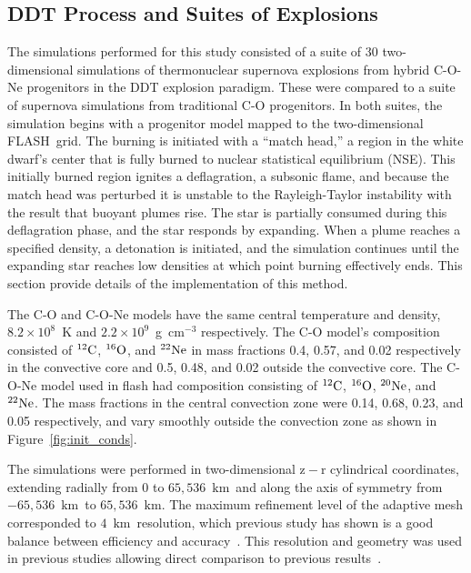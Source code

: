 \documentclass[iop,apj]{emulateapj}
\newcommand{\C}[1]{\ensuremath{{}^{#1}{\rm C}}}
\newcommand{\Ox}[1]{\ensuremath{{}^{#1}{\rm O}}}
\newcommand{\Ne}[1]{\ensuremath{{}^{#1}{\rm Ne}}}
\newcommand{\code}[1]{\textsc{#1}}
\newcommand{\FLASH}{\code{FLASH}}
\newcommand{\unitstyle}[1]{\ensuremath{\mathrm{#1}}}
\newcommand{\kilo}{\unitstyle{k}}
\newcommand{\meter}{\unitstyle{m}}
\newcommand{\km}{\kilo\meter}   %
\begin{document}
\subsection{DDT Process and Suites of Explosions}

The simulations performed for this study consisted of a suite of
30 two-dimensional simulations of
thermonuclear supernova
explosions from hybrid C-O-Ne progenitors in the DDT explosion paradigm. These
were compared to a suite of supernova simulations from traditional
C-O progenitors. In both suites, the simulation
begins with a progenitor model mapped to the two-dimensional
\FLASH\ grid. The burning is initiated with a ``match head,'' a region
in the white dwarf's center that is fully burned to nuclear statistical
equilibrium (NSE).
This initially burned region ignites a deflagration, a subsonic
flame, and because the match head was perturbed it is unstable to
the Rayleigh-Taylor instability with the result that buoyant plumes
rise. The star is partially consumed during this deflagration phase,
and the star responds by expanding.
When a plume reaches a specified density,
a detonation is initiated, and the simulation continues until
the expanding star reaches low densities at which point burning
effectively ends. This section provide details
of the implementation of this method.


The C-O and C-O-Ne models have the same central temperature
and density, $8.2\times 10^8$~K and $2.2\times 10^9$~g~cm$^{-3}$ respectively.
The C-O model's composition consisted of \C{12}, \Ox{16}, and \Ne{22} in mass fractions 0.4, 0.57, and 0.02 respectively in the convective core and 0.5, 0.48, and 0.02 outside the convective core.
The C-O-Ne model used in flash had composition consisting of \C{12}, \Ox{16}, \Ne{20}, and \Ne{22}.
The mass fractions in the central convection zone were 0.14, 0.68, 0.23, and 0.05 respectively, and vary smoothly outside the convection zone as shown in Figure~\ref{fig:init_conds}.

The simulations were performed in two-dimensional $\mathrm{z-r}$
cylindrical coordinates, extending radially from 0 to
$65,536$~\km\ and along the axis of symmetry from $-65,536$~\km\ to
$65,536$~\km. The maximum refinement level of the adaptive mesh
corresponded to $4$~\km\ resolution, which previous study has shown
is a good balance between efficiency and
accuracy~\citep{townsley.calder.ea:flame,townetal2009}.
This resolution and geometry was used in previous studies
allowing direct comparison to previous results~\citep{Kruegeretal2012}.
\end{document}
